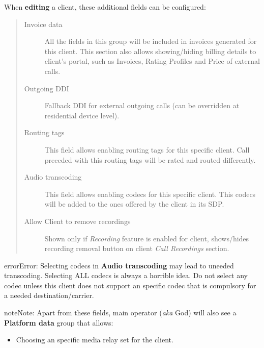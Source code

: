 \documentclass[letterpaper,10pt,english]{sphinxmanual}
\begin{document}
When \textbf{editing} a client, these additional fields can be configured:
\begin{quote}
\begin{description}
\item[{Invoice data}] \leavevmode
All the fields in this group will be included in invoices generated for this client. This section also allows
showing/hiding billing details to client's portal, such as Invoices, Rating Profiles and Price of external calls.

\item[{Outgoing DDI}] \leavevmode
Fallback DDI for external outgoing calls (can be overridden at residential device level).

\item[{Routing tags}] \leavevmode
This field allows enabling routing tags for this specific client. Call preceded with this
routing tags will be rated and routed differently.

\item[{Audio transcoding}] \leavevmode
This field allows enabling codecs for this specific client. This codecs will be added to
the ones offered by the client in its SDP.

\item[{Allow Client to remove recordings}] \leavevmode
Shown only if \emph{Recording} feature is enabled for client, shows/hides recording
removal button on client \emph{Call Recordings} section.

\end{description}
\end{quote}

\begin{notice}{error}{Error:}
Selecting codecs in \textbf{Audio transcoding} may lead to uneeded transcoding. Selecting ALL codecs is
always a horrible idea. Do not select any codec unless this client does not support an specific codec
that is compulsory for a needed destination/carrier.
\end{notice}

\begin{notice}{note}{Note:}
Apart from these fields, main operator (\emph{aka} God) will also see a \textbf{Platform data} group that allows:
\begin{itemize}
\item {} 
Choosing an specific media relay set for the client.

\end{itemize}
\end{notice}
\end{document}
